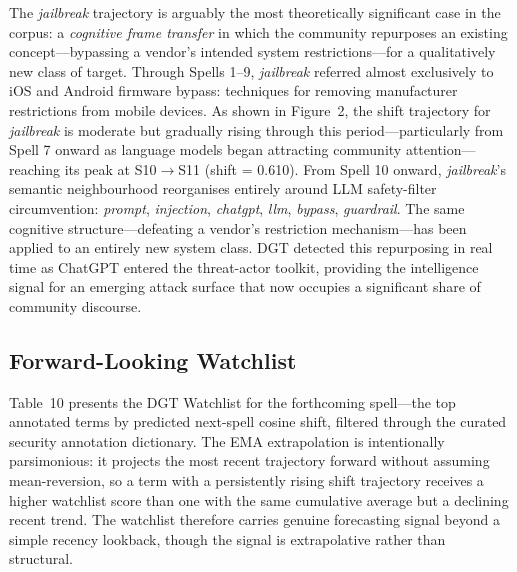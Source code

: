 \documentclass[12pt]{article}
\begin{document}
The \textit{jailbreak} trajectory is arguably the most theoretically significant case in the corpus: a \textit{cognitive frame transfer} in which the community repurposes an existing concept---bypassing a vendor's intended system restrictions---for a qualitatively new class of target. Through Spells 1--9, \textit{jailbreak} referred almost exclusively to iOS and Android firmware bypass: techniques for removing manufacturer restrictions from mobile devices. As shown in Figure~2, the shift trajectory for \textit{jailbreak} is moderate but gradually rising through this period---particularly from Spell 7 onward as language models began attracting community attention---reaching its peak at S10$\rightarrow$S11 (shift = 0.610). From Spell 10 onward, \textit{jailbreak}'s semantic neighbourhood reorganises entirely around LLM safety-filter circumvention: \textit{prompt}, \textit{injection}, \textit{chatgpt}, \textit{llm}, \textit{bypass}, \textit{guardrail}. The same cognitive structure---defeating a vendor's restriction mechanism---has been applied to an entirely new system class. DGT detected this repurposing in real time as ChatGPT entered the threat-actor toolkit, providing the intelligence signal for an emerging attack surface that now occupies a significant share of community discourse.

\subsection{Forward-Looking Watchlist}

Table~10 presents the DGT Watchlist for the forthcoming spell---the top annotated terms by predicted next-spell cosine shift, filtered through the curated security annotation dictionary. The EMA extrapolation is intentionally parsimonious: it projects the most recent trajectory forward without assuming mean-reversion, so a term with a persistently rising shift trajectory receives a higher watchlist score than one with the same cumulative average but a declining recent trend. The watchlist therefore carries genuine forecasting signal beyond a simple recency lookback, though the signal is extrapolative rather than structural.
\end{document}
